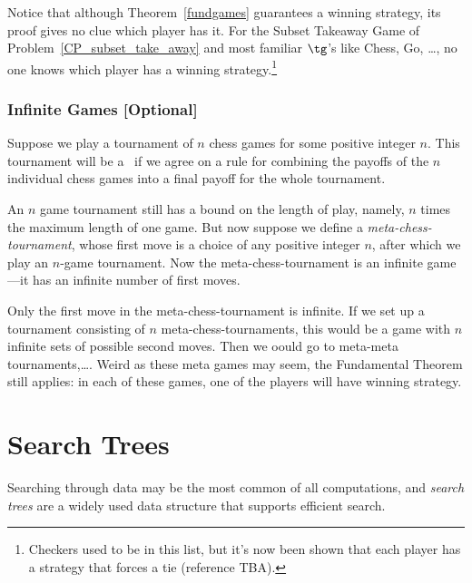 \begin{definition}
Notice that although Theorem~\ref{fundgames} guarantees a winning
strategy, its proof gives no clue which player has it.  For the Subset
Takeaway Game of Problem~\ref{CP_subset_take_away} and most familiar
$\tg$'s like Chess, Go, \dots, no one knows which player has a winning
strategy.\footnote{Checkers used to be in this list, but it's now been
  shown that each player has a strategy that forces a tie (reference
  TBA).}

\subsubsection{Infinite Games [Optional]} 

Suppose we play a tournament of $n$ chess games for some
positive integer $n$.  This tournament will be a \wnls\ if we agree on a
rule for combining the payoffs of the $n$ individual chess games into
a final payoff for the whole tournament.

An $n$ game tournament still has a bound on the length of play,
namely, $n$ times the maximum length of one game.  But now suppose we
define a \emph{meta-chess-tournament}, whose first move is a choice of
any positive integer $n$, after which we play an $n$-game tournament.
Now the meta-chess-tournament is an infinite game---it has an infinite
number of first moves.

Only the first move in the meta-chess-tournament is infinite.  If we
set up a tournament consisting of $n$ meta-chess-tournaments, this
would be a game with $n$ infinite sets of possible second moves.  Then
we oould go to meta-meta tournaments,\dots.  Weird as these meta games
may seem, the Fundamental Theorem still applies: in each of these
games, one of the players will have winning strategy.

\begin{problems}
\practiceproblems
{}

\homeworkproblems
{}
\end{problems}

\section{Search Trees}\label{search_tree}

Searching through data may be the most common of all computations, and
\emph{search trees} are a widely used data structure that supports
efficient search.


\end{definition}
